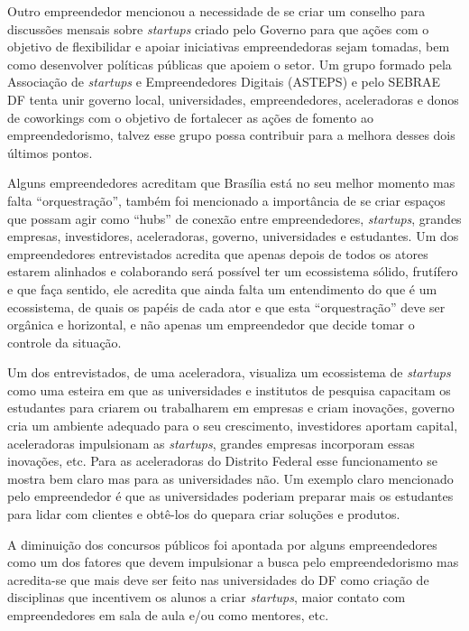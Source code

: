 Outro empreendedor mencionou a necessidade de se criar um conselho para discussões mensais sobre \textit{startups} criado pelo Governo para que ações com o objetivo de flexibilidar e apoiar iniciativas empreendedoras sejam tomadas, bem como desenvolver políticas públicas que apoiem o setor. Um grupo formado pela Associação de \textit{startups} e Empreendedores Digitais (ASTEPS) e pelo SEBRAE DF tenta unir governo local, universidades, empreendedores, aceleradoras e donos de coworkings com o objetivo de fortalecer as ações de fomento ao empreendedorismo, talvez esse grupo possa contribuir para a melhora desses  dois últimos pontos.

Alguns empreendedores acreditam que Brasília está no seu melhor momento mas falta ``orquestração'', também foi mencionado a importância de se criar espaços que possam agir como ``hubs'' de conexão entre empreendedores, \textit{startups}, grandes empresas, investidores, aceleradoras, governo, universidades e estudantes. Um dos empreendedores entrevistados acredita que apenas depois de todos os atores estarem alinhados e colaborando será possível ter um ecossistema sólido, frutífero e que faça sentido, ele acredita que ainda falta um entendimento do que é um ecossistema, de quais os papéis de cada ator e que esta ``orquestração'' deve ser orgânica e horizontal, e não apenas um empreendedor que decide tomar o controle da situação. 

Um dos entrevistados, de uma aceleradora, visualiza um ecossistema de \textit{startups} como uma esteira em que as universidades e institutos de pesquisa capacitam os estudantes para criarem ou trabalharem em empresas e criam inovações, governo cria um ambiente adequado para o seu crescimento, investidores aportam capital, aceleradoras impulsionam as \textit{startups}, grandes empresas incorporam essas inovações, etc. Para as aceleradoras do Distrito Federal esse funcionamento se mostra bem claro mas para as universidades não. Um exemplo claro mencionado pelo empreendedor é que as universidades poderiam preparar mais os estudantes para lidar com clientes e obtê-los do quepara criar soluções e produtos.

A diminuição dos concursos públicos foi apontada por alguns empreendedores como um dos fatores que devem impulsionar a busca pelo empreendedorismo mas acredita-se que mais deve ser feito nas universidades do DF como criação de disciplinas que incentivem os alunos a criar \textit{startups}, maior contato com empreendedores em sala de aula e/ou como mentores, etc.

